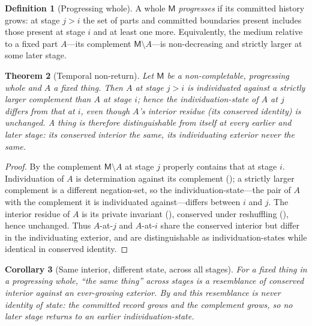 \documentclass[11pt,a4paper]{article}
\theoremstyle{thmstyle}
\newtheorem{theorem}{Theorem}[section]
\newtheorem{corollary}[theorem]{Corollary}
\theoremstyle{definition}
\newtheorem{definition}[theorem]{Definition}
\theoremstyle{remark}
\newcommand{\med}{\mathsf{M}}             %
\begin{document}
\begin{definition}[Progressing whole]
\label{def:progressing}
A whole $\med$ \emph{progresses} if its committed history grows: at stage $j>i$
the set of parts and committed boundaries present includes those present at stage
$i$ and at least one more. Equivalently, the medium relative to a fixed part
$A$---its complement $\med\setminus A$---is non-decreasing and strictly larger at
some later stage.
\end{definition}

\begin{theorem}[Temporal non-return]
\label{thm:temporal-nonreturn}
Let $\med$ be a non-completable, progressing whole and $A$ a fixed thing. Then
$A$ at stage $j>i$ is individuated against a strictly larger complement than $A$
at stage $i$; hence the individuation-state of $A$ at $j$ differs from that at
$i$, even though $A$'s interior residue \textup{(}its conserved identity\textup{)}
is unchanged. A thing is therefore distinguishable from itself at every earlier
and later stage: its conserved interior the same, its individuating exterior never
the same.
\end{theorem}

\begin{proof}
By  the complement $\med\setminus A$ at stage $j$ properly
contains that at stage $i$. Individuation of $A$ is determination against its
complement (); a strictly larger complement is a different
negation-set, so the individuation-state---the pair of $A$ with the complement it
is individuated against---differs between $i$ and $j$. The interior residue of $A$
is its private invariant (), conserved under reshuffling
(), hence unchanged. Thus $A$-at-$j$ and $A$-at-$i$ share the
conserved interior but differ in the individuating exterior, and are
distinguishable as individuation-states while identical in conserved identity.
\end{proof}

\begin{corollary}[Same interior, different state, across all stages]
\label{cor:same-different}
For a fixed thing in a progressing whole, ``the same thing'' across stages is a
resemblance of conserved interior against an ever-growing exterior. By
 and  this resemblance is never
identity of state: the committed record grows and the complement grows, so no
later stage returns to an earlier individuation-state.
\end{corollary}
\end{document}
